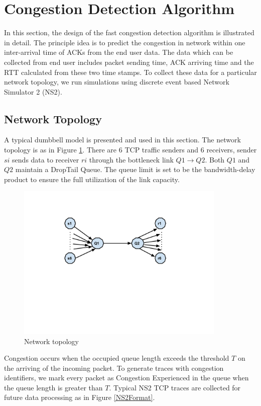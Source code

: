 \section{Congestion Detection Algorithm}
\label{Design}
In this section, the design of the fast congestion detection algorithm is illustrated in detail. The principle idea is to predict the congestion in network within one inter-arrival time of ACKs from the end user data. The data which can be collected from end user includes packet sending time, ACK arriving time and the RTT calculated from these two time stamps. To collect these data for a particular network topology, we run simulations using discrete event based Network Simulator 2 (NS2). 
\subsection{Network Topology}
A typical dumbbell model is presented and used in this section. The network topology is as in Figure \ref{layout}. There are $6$ TCP traffic senders and $6$ receivers, sender $si$ sends data to receiver $ri$ through the bottleneck link $Q1\to Q2$. Both $Q1$ and $Q2$ maintain a DropTail Queue. The queue limit is set to be the bandwidth-delay product to ensure the full utilization of the link capacity.

\begin{figure}
\centering
\includegraphics[width=10cm]{6layout.pdf}
\caption{Network topology}
\label{layout}
\end{figure}
Congestion occurs when the occupied queue length exceeds the threshold $T$ on the arriving of the incoming packet. To generate traces with congestion identifiers, we mark every packet as Congestion Experienced in the queue when the queue length is greater than $T$. Typical NS2 TCP traces  \cite{TraceFormat} are collected for future data processing as in Figure \ref{NS2Format}. 


